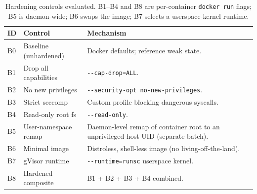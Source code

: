 \begin{table}[t]
\centering
\caption{Hardening controls evaluated. B1--B4 and B8 are per-container
\texttt{docker run} flags; B5 is daemon-wide; B6 swaps the image; B7 selects a
userspace-kernel runtime.}
\label{tab:controls}
\small
\begin{tabular}{@{}llp{7.2cm}@{}}
\toprule
ID & Control & Mechanism \\
\midrule
B0 & Baseline (unhardened)    & Docker defaults; reference weak state. \\
B1 & Drop all capabilities    & \texttt{-{}-cap-drop=ALL}. \\
B2 & No new privileges        & \texttt{-{}-security-opt no-new-privileges}. \\
B3 & Strict seccomp           & Custom profile blocking dangerous syscalls. \\
B4 & Read-only root fs        & \texttt{-{}-read-only}. \\
B5 & User-namespace remap     & Daemon-level remap of container root to an
                                unprivileged host UID (separate batch). \\
B6 & Minimal image            & Distroless, shell-less image (no living-off-the-land). \\
B7 & gVisor runtime           & \texttt{-{}-runtime=runsc} userspace kernel. \\
B8 & Hardened composite       & B1 + B2 + B3 + B4 combined. \\
\bottomrule
\end{tabular}
\end{table}

